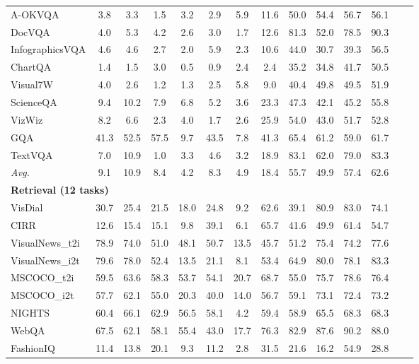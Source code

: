 \begin{table*}[ht]
{\begin{tabular}{lccccccccccccc}
A-OKVQA & 3.8 & 3.3 & 1.5 & 3.2 & 2.9 & 5.9 & 11.6 & 50.0 & 54.4 & 56.7 & 56.1\\
DocVQA & 4.0 & 5.3 & 4.2 & 2.6 & 3.0 & 1.7 & 12.6 & 81.3 & 52.0 & 78.5 & 90.3\\
InfographicsVQA & 4.6 & 4.6 & 2.7 & 2.0 & 5.9 & 2.3 & 10.6 & 44.0 & 30.7 & 39.3 & 56.5\\
ChartQA & 1.4 & 1.5 & 3.0 & 0.5 & 0.9 & 2.4 & 2.4 & 35.2 & 34.8 & 41.7 & 50.5\\
Visual7W & 4.0 &2.6 &1.2 &1.3 &2.5 &5.8 & 9.0 &40.4 & 49.8& 49.5 & 51.9\\
\rowcolor[HTML]{FFEB99} ScienceQA & 9.4 & 10.2 & 7.9 & 6.8 & 5.2 & 3.6 & 23.3 & 47.3 & 42.1 & 45.2 & 55.8\\
\rowcolor[HTML]{FFEB99} VizWiz & 8.2 & 6.6 & 2.3 & 4.0 & 1.7 & 2.6 & 25.9 & 54.0 & 43.0 & 51.7 & 52.8\\
\rowcolor[HTML]{FFEB99} GQA & 41.3 & 52.5 & 57.5 & 9.7 & 43.5 & 7.8 & 41.3 & 65.4 & 61.2 & 59.0 & 61.7\\
\rowcolor[HTML]{FFEB99} TextVQA & 7.0 & 10.9 & 1.0 & 3.3 & 4.6 & 3.2 & 18.9 & 83.1 & 62.0 & 79.0 & 83.3\\
\rowcolor[HTML]{E8E8E8} \textit{Avg.} & 9.1 & 10.9 & 8.4 & 4.2 & 8.3 & 4.9 & 18.4 & 55.7 &  49.9 & 57.4 & 62.6\\
\midrule
\multicolumn{12}{l}{\textbf{Retrieval (12 tasks)}} \\
\midrule
VisDial & 30.7 & 25.4 & 21.5 & 18.0 & 24.8 & 9.2 & 62.6 & 39.1 &  80.9 & 83.0 & 74.1\\
CIRR & 12.6 & 15.4 & 15.1 & 9.8 & 39.1 & 6.1 & 65.7 & 41.6 &  49.9 &  61.4 & 54.7\\
VisualNews\_t2i & 78.9 & 74.0 & 51.0 & 48.1 & 50.7 & 13.5 & 45.7 & 51.2 &  75.4 & 74.2 & 77.6\\
VisualNews\_i2t & 79.6 & 78.0 & 52.4 & 13.5 & 21.1 & 8.1 & 53.4 & 64.9 & 80.0 & 78.1 & 83.3\\
MSCOCO\_t2i & 59.5 & 63.6 & 58.3 & 53.7 & 54.1 & 20.7 & 68.7 & 55.0 & 75.7 & 78.6 & 76.4\\
MSCOCO\_i2t & 57.7 &62.1 &55.0 &20.3 &40.0 &14.0 & 56.7 &59.1 &73.1 & 72.4 & 73.2\\
NIGHTS & 60.4 & 66.1 & 62.9 & 56.5 & 58.1 & 4.2 & 59.4 & 58.9& 65.5 & 68.3 & 68.3\\
WebQA & 67.5 & 62.1 & 58.1 & 55.4 & 43.0 & 17.7 & 76.3 & 82.9&87.6 & 90.2 & 88.0\\
\rowcolor[HTML]{FFEB99}FashionIQ & 11.4 & 13.8 & 20.1 & 9.3 & 11.2 & 2.8 & 31.5 & 21.6& 16.2 & 54.9 & 28.8\\

\end{tabular}}
\end{table*}
